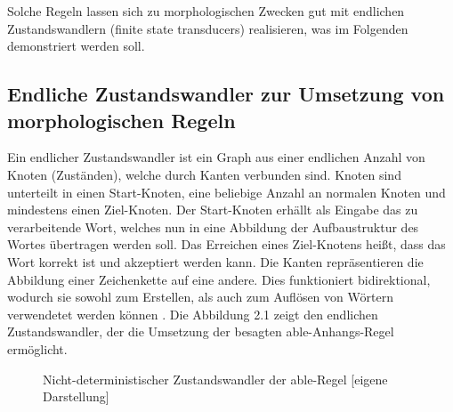 \documentclass[12pt]{report}
\begin{document}
Solche Regeln lassen sich zu morphologischen Zwecken gut mit endlichen Zustandswandlern (finite state transducers) realisieren, was im Folgenden demonstriert werden soll.

\subsection{Endliche Zustandswandler zur Umsetzung von morphologischen Regeln}
Ein endlicher Zustandswandler ist ein Graph aus einer endlichen Anzahl von Knoten (Zuständen), welche durch Kanten verbunden sind. Knoten sind unterteilt in einen Start-Knoten, eine beliebige Anzahl an normalen Knoten und mindestens einen Ziel-Knoten. Der Start-Knoten erhällt als Eingabe das zu verarbeitende Wort, welches nun in eine Abbildung der Aufbaustruktur des Wortes übertragen werden soll. Das Erreichen eines Ziel-Knotens heißt, dass das Wort korrekt ist und akzeptiert werden kann. Die Kanten repräsentieren die Abbildung einer Zeichenkette auf eine andere. Dies funktioniert bidirektional, wodurch sie sowohl zum Erstellen, als auch zum Auflösen von Wörtern verwendetet werden können \cite{cop04}. Die Abbildung 2.1 zeigt den endlichen Zustandswandler, der die Umsetzung der besagten \glqq  able\grqq{}-Anhangs-Regel ermöglicht.
\\

\begin{figure}[h!]
\begin{center}
\caption{Nicht-deterministischer Zustandswandler der able-Regel [eigene Darstellung]}
\end{center}
\end{figure}
\end{document}

